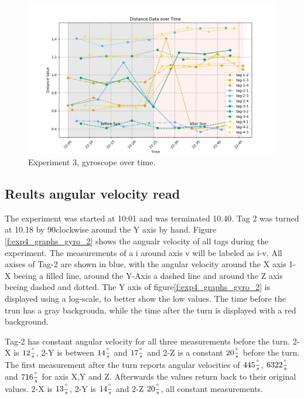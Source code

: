 \begin{figure}[ht!]
	\includegraphics[width=\linewidth]{graphics/exp/exp4_dist_data_plot_1.png}
	\caption{Experiment 3, gyroscope over time.}
	\label{f:exp4_graphs_dist}
\end{figure}


\subsection{Reults angular velocity read}
\label{ss:exp_3_result}
The experiment was started at 10:01 and was terminated 10.40.
Tag 2 was turned at 10.18 by 90\degree clockwise around the Y axis by hand.
Figure \ref{f:exp4_graphs_gyro_2} shows the angualr velocity of all tags during the experiment.
The measurements of a i around axis v will be labeled as i-v.
All axises of Tag-2 are shown in blue, with the angular velocity around the X axis 1-X beeing a filled line, around the Y-Axis a dashed line and around the Z axis beeing dashed and dotted.
The Y axis of figure\ref{f:exp4_graphs_gyro_2} is displayed using a log-scale, to better show the low values.
The time before the trun has a gray backgroudn, while the time after the turn is displayed with a red background.


Tag-2 has constant angular velocity for all three measurements before the turn.
2-X is $12\frac{^\circ}{s}$, 2-Y is between $14\frac{^\circ}{s}$ and $17\frac{^\circ}{s}$  and 2-Z is a constant $20\frac{^\circ}{s}$ before the turn.
The first measurement after the turn reports angular velocities of $445\frac{^\circ}{s}$, $6322\frac{^\circ}{s}$ and $716\frac{^\circ}{s}$ for axis X,Y and Z.
Afterwards the values return back to their original values.
2-X is $13\frac{^\circ}{s}$, 2-Y is $14\frac{^\circ}{s}$ and 2-Z $20\frac{^\circ}{s}$, all constant measurements.

